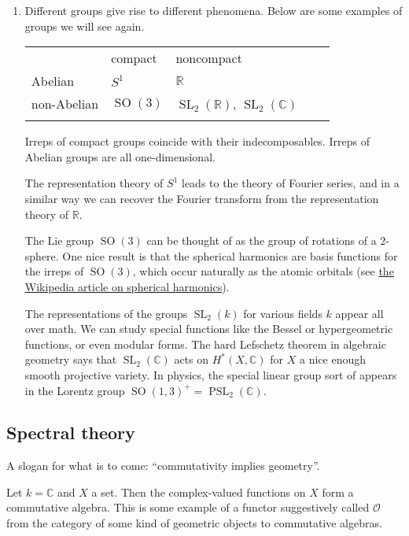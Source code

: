 \documentclass[11pt,leqno]{article}
\theoremstyle{plain}
\theoremstyle{definition}
\numberwithin{equation}{section}
\numberwithin{lem}{section}
\DeclareMathOperator{\SO}{SO}
\DeclareMathOperator{\SL}{SL}
\DeclareMathOperator{\PSL}{PSL}
\begin{document}
\begin{enumerate}
    \item Different groups give rise to different phenomena. Below are some examples of groups we will see again.
    \begin{table}[H]
\centering
\begin{tabular}{lllll}
\multicolumn{1}{l|}{}        & \multicolumn{1}{l|}{compact} & noncompact  &  &  \\ \cline{1-3}
\multicolumn{1}{l|}{Abelian} & \multicolumn{1}{l|}{$S^1$}   & $\mathbb R$ &  &  \\ \cline{1-3}
\multicolumn{1}{l|}{non-Abelian} & \multicolumn{1}{l|}{$\SO(3)$} & $\SL_2(\mathbb R)$, $\SL_2(\mathbb C)$ &  &  \\
                             &                              &             &  & 
\end{tabular}
\end{table}
    
    Irreps of compact groups coincide with their indecomposables. Irreps of Abelian groups are all one-dimensional.
    
    The representation theory of $S^1$ leads to the theory of Fourier series, and in a similar way we can recover the Fourier transform from the representation theory of $\mathbb R$.

    The Lie group $\SO(3)$ can be thought of as the group of rotations of a $2$-sphere. One nice result is that the spherical harmonics are basis functions for the irreps of $\SO(3)$, which occur naturally as the atomic orbitals (see \href{https://en.wikipedia.org/wiki/Spherical_harmonics}{the Wikipedia article on spherical harmonics}).

    The representations of the groups $\SL_2(k)$ for various fields $k$ appear all over math.  We can study special functions like the Bessel or hypergeometric functions, or even modular forms. The hard Lefschetz theorem in algebraic geometry says that $\SL_2(\mathbb C)$ acts on $H^\ast(X,\mathbb C)$ for $X$ a nice enough smooth projective variety. In physics, the special linear group sort of appears in the Lorentz group $\SO(1,3)^+ = \PSL_2(\mathbb C)$.
\end{enumerate}

\subsection{Spectral theory}
A slogan for what is to come: ``commutativity implies geometry''.

Let $k = \mathbb C$ and $X$ a set. Then the complex-valued functions on $X$ form a commutative algebra. This is some example of a functor suggestively called $\mathcal O$ from the category of some kind of geometric objects to commutative algebras.
\end{document}
